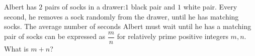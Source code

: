 Albert has $2$ pairs of socks in a drawer:$ 1$ black pair and $1$ white pair. Every second, he removes a sock randomly from the drawer, until he has matching socks. The average number of seconds Albert must wait until he has a matching pair of socks can be expressed as $\dfrac{m}{n}$ for relatively prime positive integers $m, n$. What is $m + n$?

